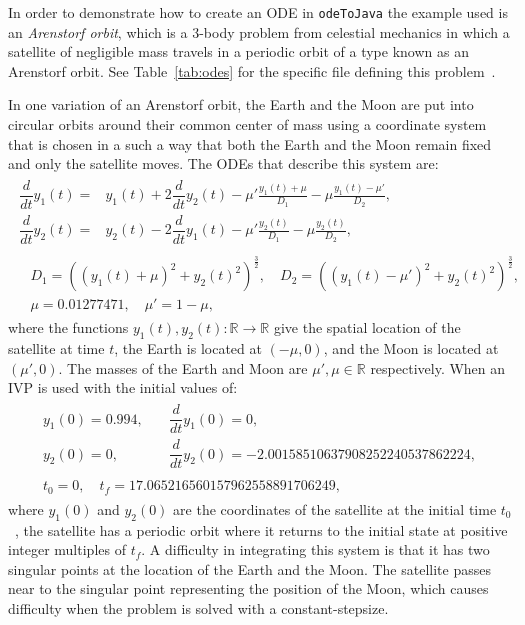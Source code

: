 \documentclass[10pt,letterpaper]{article}
\newcommand\odj{{\tt odeToJava}}
\begin{document}
In order to demonstrate how to create an ODE in \odj{} the example used is an
\emph{Arenstorf orbit}, which is a 3-body problem from celestial mechanics in
which a satellite of negligible mass travels in a periodic orbit of a type known
as an Arenstorf orbit. See Table~\ref{tab:odes} for the specific file defining
this problem~\cite{HairerNorsettWanner1993,LeimkuhlerReich2004}.

In one variation of an Arenstorf orbit, the Earth and the Moon are put into
circular orbits around their common center of mass using a coordinate system
that is chosen in a such a way that both the Earth and the Moon remain fixed and
only the satellite moves. The ODEs that describe this system are:
\begin{gather}
\begin{aligned}
  \dfrac{d}{dt} y_1(t) =& y_1(t) + 2\dfrac{d}{dt} y_2(t) - \mu' \frac{y_1(t) + \mu}{D_1} - \mu\frac{y_1(t) - \mu'}{D_2},\\
  \dfrac{d}{dt} y_2(t) =& y_2(t) - 2\dfrac{d}{dt} y_1(t) - \mu' \frac{y_2(t)}{D_1} - \mu\frac{y_2(t)}{D_2},
\end{aligned}\nonumber \\
\begin{aligned}
  & D_1 = \left((y_1(t) + \mu)^2 + {y_2(t)}^2\right)^{\frac{3}{2}},\quad D_2 = \left((y_1(t) - \mu')^2 + {y_2(t)}^2\right)^{\frac{3}{2}},\\
  & \mu = 0.01277471,\quad \mu' = 1 - \mu,
\end{aligned}
\label{eq:ems}
\end{gather}
where the functions $y_1(t),y_2(t): \mathbb{R} \rightarrow \mathbb{R}$ give the
spatial location of the satellite at time $t$, the Earth is located at
$(-\mu,0)$, and the Moon is located at $(\mu',0)$. The masses of the Earth and
Moon are $\mu',\mu \in \mathbb{R}$ respectively. When an IVP is used with the
initial values of:
\begin{gather}
\begin{aligned}
  y_1(0) = 0.994, \quad & \dfrac{d}{dt}y_1(0) = 0,\nonumber\\
  y_2(0) = 0,     \quad & \dfrac{d}{dt}y_2(0) = -2.00158510637908252240537862224,\nonumber
\end{aligned}\nonumber \\
\begin{aligned}
  t_0 = 0,\quad t_f = 17.065216560157962558891706249,
\end{aligned}
\end{gather}
where $y_1(0)$ and $y_2(0)$ are the coordinates of the satellite at the initial
time $t_0$~\cite{HairerNorsettWanner1993}, the satellite has a periodic orbit
where it returns to the initial state at positive integer multiples of $t_f$. A
difficulty in integrating this system is that it has two singular points at the
location of the Earth and the Moon. The satellite passes near to the singular
point representing the position of the Moon, which causes difficulty when the
problem is solved with a constant-stepsize.
\end{document}
